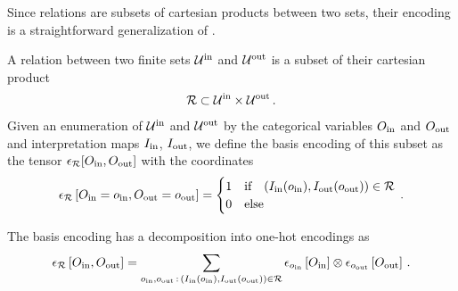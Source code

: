 

Since relations are subsets of cartesian products between two sets, their encoding is a straightforward generalization of .

\begin{definition}
    A relation between two finite sets $\mathcal{U}^{\mathrm{in}}$ and $\mathcal{U}^{\mathrm{out}}$ is a subset of their cartesian product
    \begin{align*}
        \mathcal{R} \subset \mathcal{U}^{\mathrm{in}} \times \mathcal{U}^{\mathrm{out}} \, .
    \end{align*}
    Given an enumeration of $\mathcal{U}^{\mathrm{in}}$ and $\mathcal{U}^{\mathrm{out}}$ by the categorical variables $O_{\mathrm{in}}$ and $O_{\mathrm{out}}$ and interpretation maps $I_{\mathrm{in}}$, $I_{\mathrm{out}}$, we define the basis encoding of this subset as the tensor $\epsilon_{\mathcal{R}}[O_{\mathrm{in}},O_{\mathrm{out}}]$ with the coordinates
    \begin{align*}
        \epsilon_{\mathcal{R}}\left[O_{\mathrm{in}}=o_{\mathrm{in}},O_{\mathrm{out}}=o_{\mathrm{out}}\right]
        = \begin{cases}
              1 & \text{if}\quad (I_{\mathrm{in}}(o_{\mathrm{in}}),I_{\mathrm{out}}(o_{\mathrm{out}})) \in \mathcal{R} \\
              0 & \text{else}
        \end{cases} \, .
    \end{align*}
\end{definition}

The basis encoding has a decomposition into one-hot encodings as
\begin{align*}
    \epsilon_{\mathcal{R}}\left[O_{\mathrm{in}},O_{\mathrm{out}}\right]
    = \sum_{o_{\mathrm{in}},o_{\mathrm{out}} \,:\, (I_{\mathrm{in}}(o_{\mathrm{in}}),I_{\mathrm{out}}(o_{\mathrm{out}})) \in \mathcal{R}}
    \epsilon_{o_{\mathrm{in}}}\left[O_{\mathrm{in}}\right]  \otimes \epsilon_{o_{\mathrm{out}}}\left[O_{\mathrm{out}}\right]  \, .
\end{align*}

